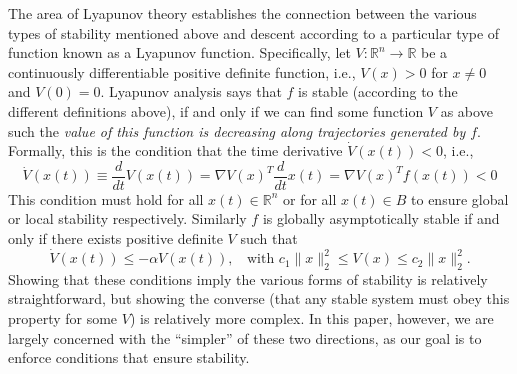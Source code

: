 The area of Lyapunov theory \citep{khalil2002nonlinear,la2012stability} establishes the connection between the various types of stability mentioned above and descent according to a particular type of function known as a Lyapunov function.  Specifically, let $V : \mathbb{R}^n \rightarrow \mathbb{R}$ be a continuously differentiable positive definite function, i.e., $V(x) > 0$ for $x \neq 0$ and $V(0) = 0$.  Lyapunov analysis says that $f$ is stable (according to the different definitions above), if and only if we can find some function $V$ as above such the \emph{value of this function is decreasing along trajectories generated by $f$}.  Formally, this is the condition that the time derivative $\dot{V}(x(t)) < 0$, i.e.,
\begin{equation}
    \dot{V}(x(t)) \equiv \frac{d}{dt}V(x(t)) = \nabla V(x)^T \frac{d}{dt} x(t) = \nabla V(x)^T f(x(t)) < 0
\end{equation}
This condition must hold for all $x(t) \in \mathbb{R}^n$ or for all $x(t) \in B$ to ensure global or local stability respectively.  Similarly $f$ is globally asymptotically stable if and only if there exists positive definite $V$ such that
\begin{equation}
    \dot{V}(x(t)) \leq -\alpha V(x(t)), \;\; \mbox{ with } c_1 \|x\|_2^2 \leq V(x) \leq c_2 \|x\|_2^2. \label{eqn:req_for_GAS}
\end{equation}
Showing that these conditions imply the various forms of stability is relatively straightforward, but showing the converse (that any stable system must obey this property for some $V$) is relatively more complex.  In this paper, however, we are largely concerned with the ``simpler'' of these two directions, as our goal is to enforce conditions that ensure stability.

